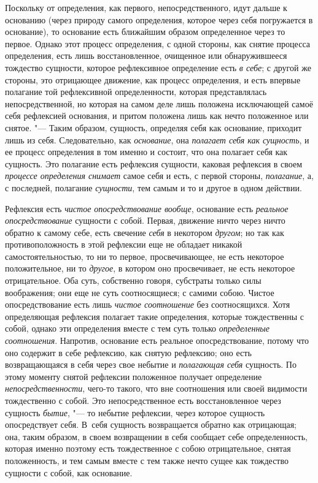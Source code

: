 Поскольку от определения, как первого, непосредственного, идут дальше к
основанию (через природу самого определения, которое через себя погружается
в основание), то основание есть ближайшим образом определенное через то
первое. Однако этот процесс определения, с одной стороны, как снятие
процесса определения, есть лишь восстановленное, очищенное или
обнаружившееся тождество сущности, которое рефлексивное определение есть
{\em в себе}; с другой же стороны, это отрицающее
движение, как процесс определения, и есть впервые полагание той
рефлексивной определенности, которая представлялась непосредственной, но
которая на самом деле лишь положена исключающей самоё себя рефлексией
основания, и притом положена лишь как нечто положенное или снятое. "--- Таким
образом, сущность, определяя себя как основание, приходит лишь из себя.
Следовательно, как {\em основание}, она
{\em полагает себя как сущность}, и ее процесс
определения в том именно и состоит, что она полагает себя как сущность. Это
полагание есть рефлексия сущности, каковая рефлексия в своем
{\em процессе определения снимает} самое себя и есть, с
первой стороны, {\em полагание}, а, с последней,
полагание {\em сущности}, тем самым и то и другое в
одном действии.

Рефлексия есть {\em чистое опосредствование вообще},
основание есть {\em реальное опосредствование} сущности
с собой. Первая, движение ничто через ничто обратно к самому себе, есть
свечение {\em себя} в некотором
{\em другом}; но так как противоположность в этой
рефлексии еще не обладает никакой самостоятельностью, то ни то первое,
просвечивающее, не есть некоторое положительное, ни то
{\em другое}, в котором оно просвечивает, не есть
некоторое отрицательное. Оба суть, собственно говоря, субстраты только силы
воображения; они еще не суть соотносящиеся; с самими собою. Чистое
опосредствование есть лишь {\em чистое соотношение} без
соотносящихся. Хотя определяющая рефлексия полагает такие определения,
которые тождественны с собой, однако эти определения вместе с тем суть
только {\em определенные соотношения}. Напротив,
основание есть реальное опосредствование, потому что оно содержит в себе
рефлексию, как снятую рефлексию; оно есть возвращающаяся в себя через свое
небытие и {\em полагающая себя} сущность. По этому
моменту снятой рефлексии положенное получает определение
{\em непосредственности}, чего-то такого, что вне
соотношения или своей видимости тождественно с собой. Это непосредственное
есть восстановленное через сущность {\em бытие}, "--- то
небытие рефлексии, через которое сущность опосредствует себя. В~себя
сущность возвращается обратно как отрицающая; она, таким образом, в своем
возвращении в себя сообщает себе определенность, которая именно поэтому
есть тождественное с собою отрицательное, снятая положенность, и тем самым
вместе с тем также нечто сущее как тождество сущности с собой, как
основание.

